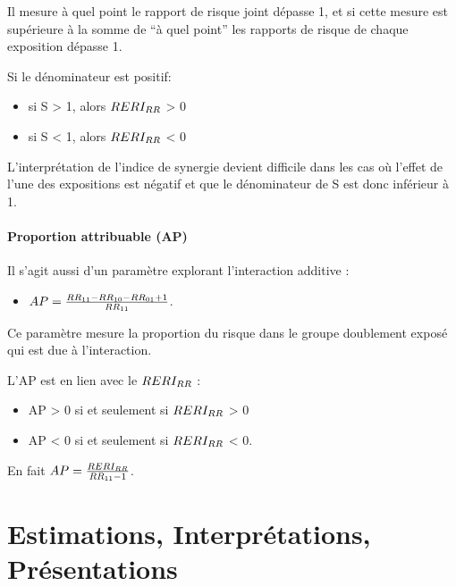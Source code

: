 \documentclass[
]{book}
\providecommand{\tightlist}{%
  \setlength{\itemsep}{0pt}\setlength{\parskip}{0pt}}
\begin{document}
Il mesure à quel point le rapport de risque joint dépasse 1, et si cette mesure est supérieure à la somme de ``à quel point'' les rapports de risque de chaque exposition dépasse 1.

Si le dénominateur est positif:

\begin{itemize}
\tightlist
\item
  si S \textgreater{} 1, alors \(\small RERI_{RR}\) \textgreater{} 0
\item
  si S \textless{} 1, alors \(\small RERI_{RR}\) \textless{} 0
\end{itemize}

L'interprétation de l'indice de synergie devient difficile dans les cas où l'effet de l'une des expositions est négatif et que le dénominateur de S est donc inférieur à 1.

\hypertarget{proportion-attribuable-ap}{%
\subsection{Proportion attribuable (AP)}\label{proportion-attribuable-ap}}

Il s'agit aussi d'un paramètre explorant l'interaction additive :

\begin{itemize}
\tightlist
\item
  \(\small AP = \frac{RR_{11} - RR_{10} - RR_{01} + 1}{RR_{11}}\).
\end{itemize}

Ce paramètre mesure la proportion du risque dans le groupe doublement exposé qui est due à l'interaction.

L'AP est en lien avec le \(\small RERI_{RR}\) :

\begin{itemize}
\tightlist
\item
  AP \textgreater{} 0 si et seulement si \(\small RERI_{RR}\) \textgreater{} 0
\item
  AP \textless{} 0 si et seulement si \(\small RERI_{RR}\) \textless{} 0.
\end{itemize}

En fait \(\small AP = \frac{RERI_{RR}}{RR_{11}-1}\).

\hypertarget{part-estimations-interpruxe9tations-pruxe9sentations}{%
\part{Estimations, Interprétations, Présentations}\label{part-estimations-interpruxe9tations-pruxe9sentations}}
\end{document}

